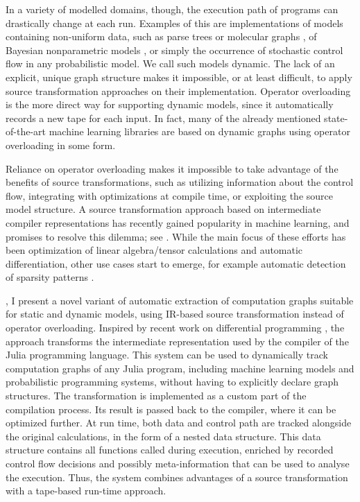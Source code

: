 In a variety of modelled domains, though, the execution path of programs can drastically change at
each run.  Examples of this are implementations of models containing non-uniform data, such as parse
trees \parencite{socher2011parsing} or molecular graphs \parencite{bianucci2000application}, of
Bayesian nonparametric models \parencite{hjort2010bayesian}, or simply the occurrence of stochastic
control flow in any probabilistic model.  We call such models dynamic.  The lack of an explicit,
unique graph structure makes it impossible, or at least difficult, to apply source transformation
approaches on their implementation.  Operator overloading is the more direct way for supporting
dynamic models, since it automatically records a new tape for each input. In fact, many of the
already mentioned state-of-the-art machine learning libraries are based on dynamic graphs using
operator overloading in some form.

Reliance on operator overloading makes it impossible to take advantage of the benefits of source
transformations, such as utilizing information about the control flow, integrating with
optimizations at compile time, or exploiting the source model structure.  A source transformation
approach based on intermediate compiler representations has recently gained popularity in machine
learning, and promises to resolve this dilemma; see \textcite{bradbury2018jax,lattner2020mlir}.
While the main focus of these efforts has been optimization of linear algebra/tensor calculations
and automatic differentiation, other use cases start to emerge, for example automatic detection of
sparsity patterns \parencite{gowda2019sparsity}.

, I present a novel variant of automatic extraction of computation graphs
suitable for static and dynamic models, using IR-based source transformation instead of operator
overloading.  Inspired by recent work on differential programming \parencite{innes2018don}, the
approach transforms the intermediate representation used by the compiler of the Julia programming
language.  This system can be used to dynamically track computation graphs of any Julia program,
including machine learning models and probabilistic programming systems, without having to
explicitly declare graph structures. The transformation is implemented as a custom part of the
compilation process.  Its result is passed back to the compiler, where it can be optimized
further. At run time, both data and control path are tracked alongside the original calculations, in
the form of a nested data structure.  This data structure contains all functions called during
execution, enriched by recorded control flow decisions and possibly meta-information that can be
used to analyse the execution. Thus, the system combines advantages of a source transformation with
a tape-based run-time approach.


